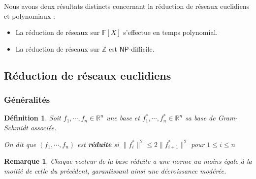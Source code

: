 \documentclass[a4paper,12pt]{report}  %
\theoremstyle{definitionstyle}
\newtheorem{definition}{Définition}[chapter] %
\theoremstyle{examplestyle}
\theoremstyle{remarkstyle}
\newtheorem{remark}{Remarque}[chapter] %
\theoremstyle{propositionstyle}
\theoremstyle{theoremstyle}
\theoremstyle{proofstyle}
\begin{document}
	Nous avons deux résultats distincts concernant la réduction de réseaux euclidiens et polynomiaux :
	
	\begin{itemize}
		\item La réduction de réseaux sur $\mathbb{F}[X]$ s'effectue en temps polynomial.
		\item La réduction de réseaux sur $\mathbb{Z}$ est $\mathsf{NP}$-difficile.
	\end{itemize}	
	
	\subsection{Réduction de réseaux euclidiens}

	\subsubsection{Généralités}
	
\begin{definition}{\cite{MCA}}
	Soit $f_1, \cdots, f_n \in \mathbb{R}^n$ une base et $f_1^*, \cdots, f_n^*\in\mathbb{R}^n$ sa base de Gram-Schmidt associée.
	
	On dit que $(f_1, \cdots, f_n)$ est \textbf{réduite} si $\|f_i^*\|^2 \leq 2 \| f_{i+1}^*\|^2$ pour $1 \leq i \leq n$ 
\end{definition}
	
\begin{remark}
	Chaque vecteur de la base réduite a une norme au moins égale à la moitié de celle du précédent, garantissant ainsi une décroissance modérée.
\end{remark}	
	
\end{document}
